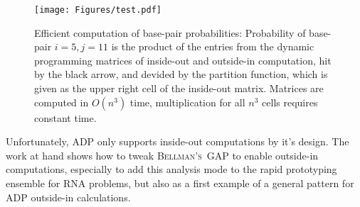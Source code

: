 \documentclass[paper=a4,fontsize=12pt]{scrartcl}
\newcommand{\progname}[1]{\mbox{\textsc{#1}}\xspace}
\def\bgap{\progname{Bellman's GAP}}
\begin{document}
	\begin{figure}
		\label{fig:dpmatrices}
		\begin{center}
			\texttt{[image: Figures/test.pdf]}
			\caption{Efficient computation of base-pair probabilities: Probability of base-pair $i=5, j=11$ is the product of the entries from the dynamic programming matrices of inside-out and outside-in computation, hit by the black arrow, and devided by the partition function, which is given as the upper right cell of the inside-out matrix. Matrices are computed in $O(n^3)$ time, multiplication for all $n^3$ cells requires constant time.}
		\end{center}
	\end{figure}
	
	Unfortunately, ADP only supports inside-out computations by it's design. The work at hand shows how to tweak \bgap to enable outside-in computations, especially to add this analysis mode to the rapid prototyping ensemble for RNA problems, but also as a first example of a general pattern for ADP outside-in calculations.



\end{document}
